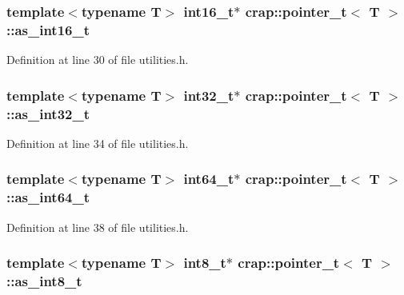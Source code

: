 \subsubsection[{as\+\_\+int16\+\_\+t}]{\setlength{\rightskip}{0pt plus 5cm}template$<$typename T$>$ int16\+\_\+t$\ast$ {\bf crap\+::pointer\+\_\+t}$<$ T $>$\+::as\+\_\+int16\+\_\+t}\label{structcrap_1_1pointer__t_af49743e61d30272abb1a93697114aaa9}


Definition at line 30 of file utilities.\+h.

\hypertarget{structcrap_1_1pointer__t_a15321a6137835f60c744f2f98a0a3f3d}{}
\subsubsection[{as\+\_\+int32\+\_\+t}]{\setlength{\rightskip}{0pt plus 5cm}template$<$typename T$>$ int32\+\_\+t$\ast$ {\bf crap\+::pointer\+\_\+t}$<$ T $>$\+::as\+\_\+int32\+\_\+t}\label{structcrap_1_1pointer__t_a15321a6137835f60c744f2f98a0a3f3d}


Definition at line 34 of file utilities.\+h.

\hypertarget{structcrap_1_1pointer__t_a6755b7dbb833df711003a1b6e3188916}{}
\subsubsection[{as\+\_\+int64\+\_\+t}]{\setlength{\rightskip}{0pt plus 5cm}template$<$typename T$>$ int64\+\_\+t$\ast$ {\bf crap\+::pointer\+\_\+t}$<$ T $>$\+::as\+\_\+int64\+\_\+t}\label{structcrap_1_1pointer__t_a6755b7dbb833df711003a1b6e3188916}


Definition at line 38 of file utilities.\+h.

\hypertarget{structcrap_1_1pointer__t_a00a337da13cb56f4f649c524af7606b1}{}
\subsubsection[{as\+\_\+int8\+\_\+t}]{\setlength{\rightskip}{0pt plus 5cm}template$<$typename T$>$ int8\+\_\+t$\ast$ {\bf crap\+::pointer\+\_\+t}$<$ T $>$\+::as\+\_\+int8\+\_\+t}\label{structcrap_1_1pointer__t_a00a337da13cb56f4f649c524af7606b1}


